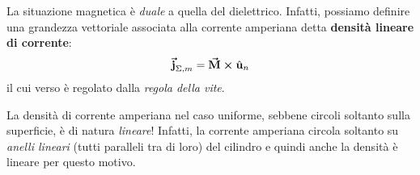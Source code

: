 \noindent La situazione magnetica è \textit{duale} a quella del dielettrico. Infatti, possiamo definire una grandezza vettoriale associata alla corrente amperiana detta \textbf{densità lineare di corrente}:
\begin{equation}
	\vb*{\va{j}}_{\Sigma, m}=\vb*{\va{M}}\cross\hat{\mathbf{u}}_n\label{CorrenteAmpereUnif}
\end{equation}
il cui verso è regolato dalla \textit{regola della vite}.
\begin{attention}
	La densità di corrente amperiana nel caso uniforme, sebbene circoli soltanto sulla superficie, è di natura \textit{lineare}! Infatti, la corrente amperiana circola soltanto su \textit{anelli lineari} (tutti paralleli tra di loro) del cilindro e quindi anche la densità è lineare per questo motivo.
\end{attention}
